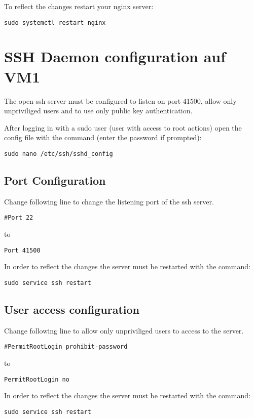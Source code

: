 \documentclass[10pt,a4paper]{article}
\begin{document}
To reflect the changes restart your nginx server:
\begin{verbatim}
sudo systemctl restart nginx
\end{verbatim}

\newpage
\section{SSH Daemon configuration auf VM1}
The open ssh server must be configured to listen on port 41500, allow only unpriviliged users and to use only public key authentication.

After logging in with a sudo user (user with access to root actions) open the config file with the command (enter the password if prompted):

\begin{verbatim}
sudo nano /etc/ssh/sshd_config
\end{verbatim}

\subsection{Port Configuration}
Change following line to change the listening port of the ssh server.

\begin{verbatim}
#Port 22
\end{verbatim}
to
\begin{verbatim}
Port 41500
\end{verbatim}

In order to reflect the changes the server must be restarted with the command:
\begin{verbatim}
sudo service ssh restart
\end{verbatim}

\subsection{User access configuration}
Change following line to allow only unpriviliged users to access to the server.

\begin{verbatim}
#PermitRootLogin prohibit-password
\end{verbatim}
to
\begin{verbatim}
PermitRootLogin no
\end{verbatim}

In order to reflect the changes the server must be restarted with the command:
\begin{verbatim}
sudo service ssh restart
\end{verbatim}
\end{document}
